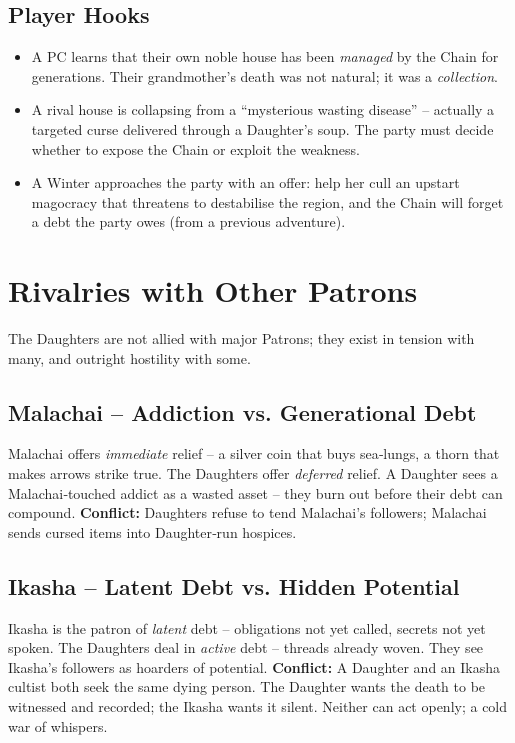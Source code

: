 \documentclass[10pt,twoside]{book}
\begin{document}
\section{Player Hooks}
\begin{itemize}
\item A PC learns that their own noble house has been \textit{managed} by the Chain for generations. Their grandmother's death was not natural; it was a \textit{collection}.
\item A rival house is collapsing from a “mysterious wasting disease” – actually a targeted curse delivered through a Daughter's soup. The party must decide whether to expose the Chain or exploit the weakness.
\item A Winter approaches the party with an offer: help her cull an upstart magocracy that threatens to destabilise the region, and the Chain will forget a debt the party owes (from a previous adventure).
\end{itemize}

\chapter{Rivalries with Other Patrons}

The Daughters are not allied with major Patrons; they exist in tension with many, and outright hostility with some.

\section{Malachai – Addiction vs. Generational Debt}
Malachai offers \emph{immediate} relief – a silver coin that buys sea‑lungs, a thorn that makes arrows strike true. The Daughters offer \emph{deferred} relief. A Daughter sees a Malachai‑touched addict as a wasted asset – they burn out before their debt can compound. \textbf{Conflict:} Daughters refuse to tend Malachai's followers; Malachai sends cursed items into Daughter‑run hospices.

\section{Ikasha – Latent Debt vs. Hidden Potential}
Ikasha is the patron of \emph{latent} debt – obligations not yet called, secrets not yet spoken. The Daughters deal in \emph{active} debt – threads already woven. They see Ikasha's followers as hoarders of potential. \textbf{Conflict:} A Daughter and an Ikasha cultist both seek the same dying person. The Daughter wants the death to be witnessed and recorded; the Ikasha wants it silent. Neither can act openly; a cold war of whispers.
\end{document}
